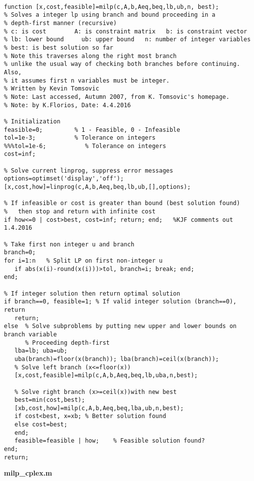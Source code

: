 \documentclass[12pt]{article}
\begin{document}
\begin{lstlisting}

function [x,cost,feasible]=milp(c,A,b,Aeq,beq,lb,ub,n, best);   
% Solves a integer lp using branch and bound proceeding in a 
% depth-first manner (recursive)
% c: is cost        A: is constraint matrix   b: is constraint vector
% lb: lower bound     ub: upper bound   n: number of integer variables
% best: is best solution so far
% Note this traverses along the right most branch
% unlike the usual way of checking both branches before continuing. Also,
% it assumes first n variables must be integer.
% Written by Kevin Tomsovic
% Note: Last accessed, Autumn 2007, from K. Tomsovic's homepage.
% Note: by K.Florios, Date: 4.4.2016

% Initialization
feasible=0;         % 1 - Feasible, 0 - Infeasible
tol=1e-3;           % Tolerance on integers
%%%tol=1e-6;           % Tolerance on integers
cost=inf;

% Solve current linprog, suppress error messages
options=optimset('display','off');
[x,cost,how]=linprog(c,A,b,Aeq,beq,lb,ub,[],options);

% If infeasible or cost is greater than bound (best solution found)
%   then stop and return with infinite cost
if how<=0 | cost>best, cost=inf; return; end;   %KJF comments out 1.4.2016

% Take first non integer u and branch
branch=0;
for i=1:n   % Split LP on first non-integer u
   if abs(x(i)-round(x(i)))>tol, branch=i; break; end;
end;      

% If integer solution then return optimal solution
if branch==0, feasible=1; % If valid integer solution (branch==0), return 
   return;   
else  % Solve subproblems by putting new upper and lower bounds on branch variable
      % Proceeding depth-first
   lba=lb; uba=ub;
   uba(branch)=floor(x(branch)); lba(branch)=ceil(x(branch));
   % Solve left branch (x<=floor(x)) 
   [x,cost,feasible]=milp(c,A,b,Aeq,beq,lb,uba,n,best);
   
   % Solve right branch (x>=ceil(x))with new best
   best=min(cost,best);
   [xb,cost,how]=milp(c,A,b,Aeq,beq,lba,ub,n,best);
   if cost<best, x=xb; % Better solution found
   else cost=best; 
   end; 
   feasible=feasible | how;    % Feasible solution found?
end;
return;

\end{lstlisting}



\textbf{milp\_cplex.m}
\end{document}
